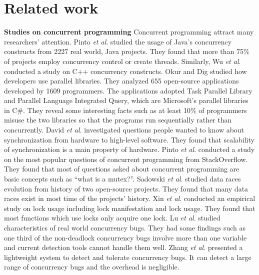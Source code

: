 \section{Related work}
\textbf{Studies on concurrent programming}
Concurrent programming attract many researchers' attention. Pinto \textit{et al}. \cite{journals/jss/PintoTFFB15} studied the usage of Java's concurrency constructs from 2227 real world, Java projects. They found that more than 75\% of projects employ concurrency control or create threads. Similarly, Wu \textit{et al}. \cite{journals/infsof/WuCZX16} conducted a study on C++ concurrency constructs. Okur and Dig \cite{conf/sigsoft/OkurD12} studied how developers use parallel libraries. They analyzed 655 open-source applications developed by 1609 programmers. The applications adopted Task Parallel Library and Parallel Language Integrated Query, which are Microsoft's parallel libraries in C\#. They reveal some interesting facts such as at least 10\% of programmers misuse the two libraries so that the programs run sequentially rather than concurrently. David \textit{et al}. \cite{conf/sosp/DavidGT13} investigated questions people wanted to know about synchronization from hardware to high-level software. They found that scalability of synchronization is a main property of hardware. Pinto \textit{et al}. \cite{conf/oopsla/PintoTC15} conducted a study on the most popular questions of concurrent programming from StackOverflow. They found that most of questions asked about concurrent programming are basic concepts such as ``what is a mutex?''. Sadowski \textit{et al}. \cite{conf/msr/SadowskiYK12} studied data races evolution from history of two open-source projects. They found that many data races exist in most time of the projects' history. Xin \textit{et al}. \cite{conf/icsm/XinQHXZWG13} conducted an empirical study on lock usage including lock manifestation and lock usage. They found that most functions which use locks only acquire one lock. Lu \textit{et al}. \cite{conf/asplos/LuPSZ08} studied characteristics of real world concurrency bugs. They had some findings such as one third of the non-deadlock concurrency bugs involve more than one variable and current detection tools cannot handle them well. Zhang \textit{et al}. \cite{journals/tse/ZhangWLQRZ16} presented a lightweight system to detect and tolerate concurrency bugs. It can detect a large range of concurrency bugs and the overhead is negligible.

